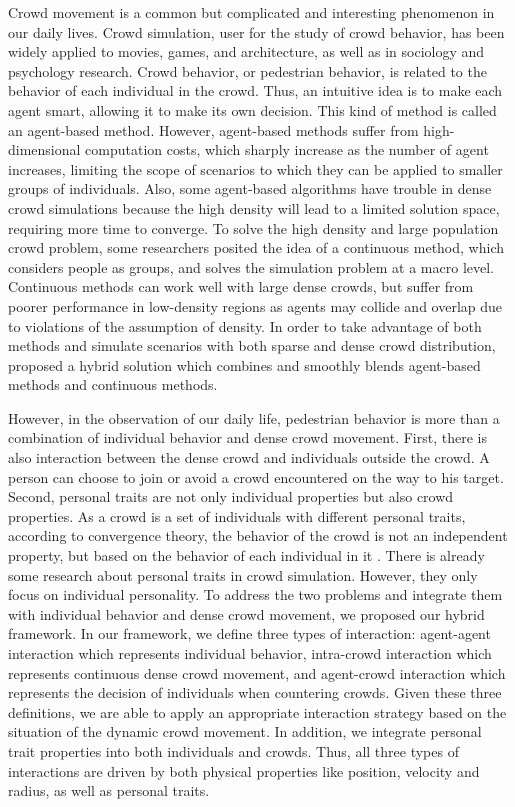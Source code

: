 \documentclass[conference]{acmsiggraph}
\begin{document}
Crowd movement is a common but complicated and interesting phenomenon in our daily lives. Crowd simulation, user for the study of crowd behavior, has been widely applied to movies, games, and architecture, as well as in sociology and psychology research. Crowd behavior, or pedestrian behavior, is related to the behavior of each individual in the crowd. Thus, an intuitive idea is to make each agent smart, allowing it to make its own decision. This kind of method is called an agent-based method. However, agent-based methods suffer from high-dimensional computation costs, which sharply increase as the number of agent increases, limiting the scope of scenarios to which they can be applied to smaller groups of individuals. Also, some agent-based algorithms have trouble in dense crowd simulations because the high density will lead to a limited solution space, requiring more time to converge. To solve the high density and large population crowd problem, some researchers posited the idea of a continuous method, which considers people as groups, and solves the simulation problem at a macro level. Continuous methods can work well with large dense crowds, but suffer from poorer performance in low-density regions as agents may collide and overlap due to violations of the assumption of density. In order to take advantage of both methods and simulate scenarios with both sparse and dense crowd distribution, \cite{Golas:2013} proposed a hybrid solution which combines and smoothly blends agent-based methods and continuous methods.

However, in the observation of our daily life, pedestrian behavior is more than a combination of individual behavior and dense crowd movement. First, there is also interaction between the dense crowd and individuals outside the crowd. A person can choose to join or avoid a crowd encountered on the way to his target. Second, personal traits are not only individual properties but also crowd properties. As a crowd is a set of individuals with different personal traits, according to convergence theory, the behavior of the crowd is not an independent property, but based on the behavior of each individual in it \cite{Turner:1957}. There is already some research about personal traits in crowd simulation. However, they only focus on individual personality. To address the two problems and integrate them with individual behavior and dense crowd movement, we proposed our hybrid framework. In our framework, we define three types of interaction: agent-agent interaction which represents individual behavior, intra-crowd interaction which represents continuous dense crowd movement, and agent-crowd interaction which represents the decision of individuals when countering crowds. Given these three definitions, we are able to apply an appropriate interaction strategy based on the situation of the dynamic crowd movement. In addition, we integrate personal trait properties into both individuals and crowds. Thus, all three types of interactions are driven by both physical properties like position, velocity and radius, as well as personal traits.
\end{document}

